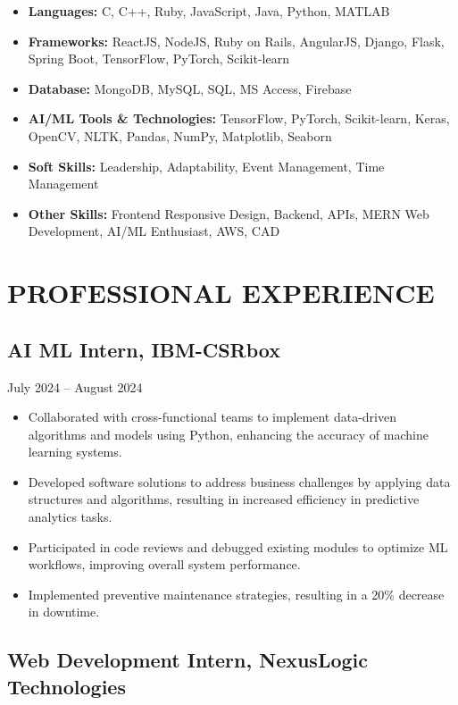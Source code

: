 \documentclass{article}
\begin{document}
\begin{itemize}[leftmargin=*]
    \item \textbf{Languages:} C, C++, Ruby, JavaScript, Java, Python, MATLAB
    \item \textbf{Frameworks:} ReactJS, NodeJS, Ruby on Rails, AngularJS, Django, Flask, Spring Boot, TensorFlow, PyTorch, Scikit-learn
    \item \textbf{Database:} MongoDB, MySQL, SQL, MS Access, Firebase
    \item \textbf{AI/ML Tools \& Technologies:} TensorFlow, PyTorch, Scikit-learn, Keras, OpenCV, NLTK, Pandas, NumPy, Matplotlib, Seaborn
    \item \textbf{Soft Skills:} Leadership, Adaptability, Event Management, Time Management
    \item \textbf{Other Skills:} Frontend Responsive Design, Backend, APIs, MERN Web Development, AI/ML Enthusiast, AWS, CAD
\end{itemize}

\section*{PROFESSIONAL EXPERIENCE}

\subsection*{AI ML Intern, IBM-CSRbox}

July 2024 -- August 2024

\begin{itemize}[leftmargin=*]
    \item Collaborated with cross-functional teams to implement data-driven algorithms and models using Python, enhancing the accuracy of machine learning systems.
    \item Developed software solutions to address business challenges by applying data structures and algorithms, resulting in increased efficiency in predictive analytics tasks.
    \item Participated in code reviews and debugged existing modules to optimize ML workflows, improving overall system performance.
    \item Implemented preventive maintenance strategies, resulting in a 20\% decrease in downtime.
\end{itemize}

\subsection*{Web Development Intern, NexusLogic Technologies}
\end{document}

